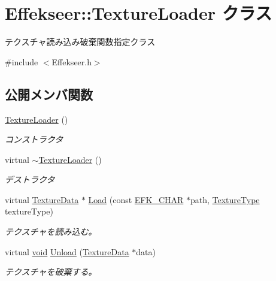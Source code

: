 \hypertarget{class_effekseer_1_1_texture_loader}{}\section{Effekseer\+:\+:Texture\+Loader クラス}
\label{class_effekseer_1_1_texture_loader}


テクスチャ読み込み破棄関数指定クラス  




{\ttfamily \#include $<$Effekseer.\+h$>$}

\subsection*{公開メンバ関数}
\begin{DoxyCompactItemize}
\item 
\mbox{\hyperlink{class_effekseer_1_1_texture_loader_a41dcac0ae6143fd422486aa504021f2c}{Texture\+Loader}} ()
\begin{DoxyCompactList}\small\item\em コンストラクタ \end{DoxyCompactList}\item 
virtual \mbox{\hyperlink{class_effekseer_1_1_texture_loader_a95b67c6e4fd84a77eb24b8e73b79ab14}{$\sim$\+Texture\+Loader}} ()
\begin{DoxyCompactList}\small\item\em デストラクタ \end{DoxyCompactList}\item 
virtual \mbox{\hyperlink{struct_effekseer_1_1_texture_data}{Texture\+Data}} $\ast$ \mbox{\hyperlink{class_effekseer_1_1_texture_loader_a91cc55233a4131d9994857dfe611460b}{Load}} (const \mbox{\hyperlink{_effekseer_8h_aca7eb5de6dd019c19ac58ea35a193f2f}{E\+F\+K\+\_\+\+C\+H\+AR}} $\ast$path, \mbox{\hyperlink{namespace_effekseer_a781925ba462884c4ef87fd38ffdedba4}{Texture\+Type}} texture\+Type)
\begin{DoxyCompactList}\small\item\em テクスチャを読み込む。 \end{DoxyCompactList}\item 
virtual \mbox{\hyperlink{namespace_effekseer_ab34c4088e512200cf4c2716f168deb56}{void}} \mbox{\hyperlink{class_effekseer_1_1_texture_loader_a128fdd6e613758012fb9ceaf2881adb7}{Unload}} (\mbox{\hyperlink{struct_effekseer_1_1_texture_data}{Texture\+Data}} $\ast$data)
\begin{DoxyCompactList}\small\item\em テクスチャを破棄する。 \end{DoxyCompactList}\end{DoxyCompactItemize}


